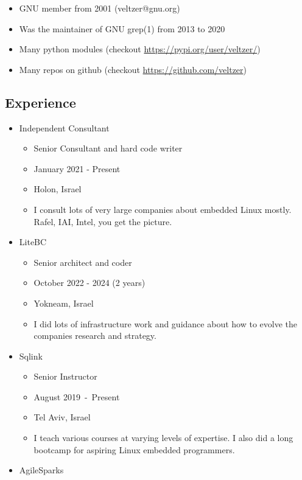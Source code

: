 \documentclass[
]{article}
\providecommand{\tightlist}{%
  \setlength{\itemsep}{0pt}\setlength{\parskip}{0pt}}
\begin{document}
\begin{itemize}
\tightlist
\item
  GNU member from 2001 (veltzer@gnu.org)
\item
  Was the maintainer of GNU grep(1) from 2013 to 2020
\item
  Many python modules (checkout \url{https://pypi.org/user/veltzer/})
\item
  Many repos on github (checkout \url{https://github.com/veltzer})
\end{itemize}

\subsection{Experience}\label{experience}

\begin{itemize}
\tightlist
\item
  Independent Consultant

  \begin{itemize}
  \tightlist
  \item
    Senior Consultant and hard code writer
  \item
    January 2021 - Present
  \item
    Holon, Israel
  \item
    I consult lots of very large companies about embedded Linux mostly.
    Rafel, IAI, Intel, you get the picture.
  \end{itemize}
\item
  LiteBC

  \begin{itemize}
  \tightlist
  \item
    Senior architect and coder
  \item
    October 2022 - 2024 (2 years)
  \item
    Yokneam, Israel
  \item
    I did lots of infrastructure work and guidance about how to evolve
    the companies research and strategy.
  \end{itemize}
\item
  Sqlink

  \begin{itemize}
  \tightlist
  \item
    Senior Instructor
  \item
    August 2019~-~Present
  \item
    Tel Aviv, Israel
  \item
    I teach various courses at varying levels of expertise. I also did a
    long bootcamp for aspiring Linux embedded programmers.
  \end{itemize}
\item
  AgileSparks


\end{itemize}
\end{document}
